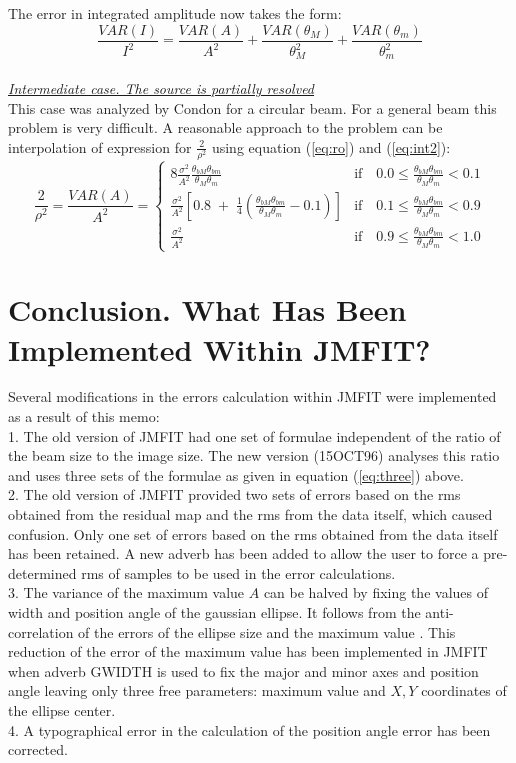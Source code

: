 The error in integrated amplitude now takes the form:
\begin{equation}
\frac{VAR(I)}{I^2} = \frac{VAR(A)}{A^2} + \frac{VAR(\theta_M)}{\theta_M^2} + \frac{VAR(\theta_m)}{\theta_m^2}
\end{equation}
\\
\underline{\em Intermediate case. The source is partially resolved}\\
This case was analyzed by Condon \cite{jjcon} for a circular beam. For
a general beam this problem is very difficult. A reasonable approach
to the problem can be interpolation of expression for
$\frac{2}{\rho^2}$ using equation (\ref {eq:ro}) and (\ref{eq:int2}):
\begin{equation}
\frac{2}{\rho^2}=\frac{VAR(A)}{A^2} = \left\{
\begin{array}{ll}
8 \frac{\sigma^2}{A^2} \frac{\theta_{bM}\theta_{bm}}{\theta_{M}\theta_{m}}
 & \mbox{if~~ $0.0 \leq \frac{\theta_{bM}\theta_{bm}}{\theta_{M}\theta_{m}} < 0.1$}\\
\frac{\sigma^2}{A^2}\left[0.8 \;+\; \frac{1}{4}\left(\frac{\theta_{bM}\theta_{bm}}{\theta_{M}\theta_{m}} - 0.1\right)\right]
 & \mbox{if~~ $0.1 \leq \frac{\theta_{bM}\theta_{bm}}{\theta_{M}\theta_{m}} < 0.9$}\\
\frac{\sigma^2}{A^2}  & \mbox{if~~ $0.9\leq \frac{\theta_{bM}\theta_{bm}}{\theta_{M}\theta_{m}} < 1.0$}
\end{array}
\right.
\label{eq:three}
\end{equation}
\section{Conclusion. What Has Been Implemented Within JMFIT?}
Several modifications in the errors calculation within JMFIT  were
implemented as a result of this memo:\\
1.  The old version of JMFIT had one set of formulae independent of
the ratio of the beam size to the image size. The new version
(15OCT96) analyses this ratio and uses three sets of the formulae as
given in equation (\ref{eq:three}) above.\\
2. The old version of JMFIT provided two sets of errors based on the
rms obtained from the residual map and the rms from the data itself,
which caused confusion. Only one set of errors based on the rms
obtained from the data itself has been retained. A new adverb has been
added to allow the user to force a pre-determined rms of samples to be
used in the error calculations.\\
3. The variance of the maximum value $A$ can be halved by fixing the
values of width and position angle of the gaussian ellipse. It follows
from the anti-correlation of the errors of the ellipse size and the
maximum value \cite{jjcon}. This reduction of the error of the maximum
value has been implemented in JMFIT when adverb GWIDTH is used to fix
the  major and minor axes and position angle leaving only three free
parameters: maximum value and $X,Y$ coordinates of the ellipse center.\\
4. A typographical error in the calculation of the position angle
error has been corrected.


